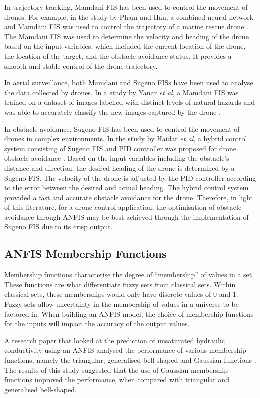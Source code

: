 In trajectory tracking, Mamdani FIS has been used to control the movement of drones. For example, in the study by Pham and Han, a combined neural network and Mamdani FIS was used to control the trajectory of a marine rescue drone \cite{boxi7}. The Mamdani FIS was used to determine the velocity and heading of the drone based on the input variables, which included the current location of the drone, the location of the target, and the obstacle avoidance status. It provides a smooth and stable control of the drone trajectory. 

In aerial surveillance, both Mamdani and Sugeno FISs have been used to analyse the data collected by drones. In a study by Yanar \textit{et al}, a Mamdani FIS was trained on a dataset of images labelled with distinct levels of natural hazards and was able to accurately classify the new images captured by the drone \cite{boxi13}. 

In obstacle avoidance, Sugeno FIS has been used to control the movement of drones in complex environments. In the study by Haidar \textit{et al}, a hybrid control system consisting of Sugeno FIS and PID controller was proposed for drone obstacle avoidance \cite{zain7}. Based on the input variables including the obstacle’s distance and direction, the desired heading of the drone is determined by a Sugeno FIS. The velocity of the drone is adjusted by the PID controller according to the error between the desired and actual heading. The hybrid control system provided a fast and accurate obstacle avoidance for the drone. Therefore, in light of this literature, for a drone control application, the optimisation of obstacle avoidance through ANFIS may be best achieved through the implementation of Sugeno FIS due to its crisp output. 

\subsection{ANFIS Membership Functions} 

Membership functions characterise the degree of ``membership'' of values in a set. These functions are what differentiate fuzzy sets from classical sets. Within classical sets, these memberships would only have discrete values of 0 and 1. Fuzzy sets allow uncertainty in the membership of values in a universe to be factored in. When building an ANFIS model, the choice of membership functions for the inputs will impact the accuracy of the output values. 

A research paper that looked at the prediction of unsaturated hydraulic conductivity using an ANFIS analysed the performance of various membership functions, namely the triangular, generalised bell-shaped and Gaussian functions \cite{656546546}. The results of this study suggested that the use of Gaussian membership functions improved the performance, when compared with triangular and generalised bell-shaped. 

